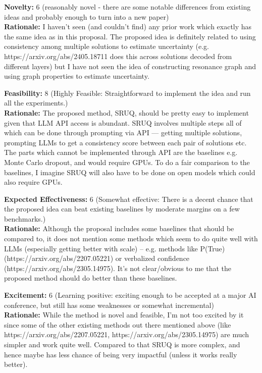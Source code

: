 \begin{tcolorbox}[colback=green!10!white, colframe=green!80!black, title=\textbf{Reviewer 1}]
\small
\textbf{Novelty:} 6 (reasonably novel - there are some notable differences from existing ideas and probably enough to turn into a new paper)\\
\textbf{Rationale:} I haven't seen (and couldn't find) any prior work which exactly has the same idea as in this proposal. The proposed idea is definitely related to using consistency among multiple solutions to estimate uncertainty (e.g. https://arxiv.org/abs/2405.18711 does this across solutions decoded from different layers) but I have not seen the idea of constructing resonance graph and using graph properties to estimate uncertainty.

\vspace{10pt}

\textbf{Feasibility:} 8 (Highly Feasible: Straightforward to implement the idea and run all the experiments.)\\
\textbf{Rationale:} The proposed method, SRUQ, should be pretty easy to implement given that LLM API access is abundant. SRUQ involves multiple steps all of which can be done through prompting via API --- getting multiple solutions, prompting LLMs to get a consistency score between each pair of solutions etc. The parts which cannot be implemented through API are the baselines e.g. Monte Carlo dropout, and would require GPUs. To do a fair comparison to the baselines, I imagine SRUQ will also have to be done on open models which could also require GPUs.

\vspace{10pt}

\textbf{Expected Effectiveness:} 6 (Somewhat effective: There is a decent chance that the proposed idea can beat existing baselines by moderate margins on a few benchmarks.)\\
\textbf{Rationale:} Although the proposal includes some baselines that should be compared to, it does not mention some methods which seem to do quite well with LLMs (especially getting better with scale) -- e.g. methods like P(True) (https://arxiv.org/abs/2207.05221) or verbalized confidence (https://arxiv.org/abs/2305.14975). It's not clear/obvious to me that the proposed method should do better than these baselines.

\vspace{10pt}

\textbf{Excitement:} 6 (Learning positive: exciting enough to be accepted at a major AI conference, but still has some weaknesses or somewhat incremental)\\
\textbf{Rationale:} While the method is novel and feasible, I'm not too excited by it since some of the other existing methods out there mentioned above (like https://arxiv.org/abs/2207.05221, https://arxiv.org/abs/2305.14975) are much simpler and work quite well. Compared to that SRUQ is more complex, and hence maybe has less chance of being very impactful (unless it works really better).


\end{tcolorbox}
